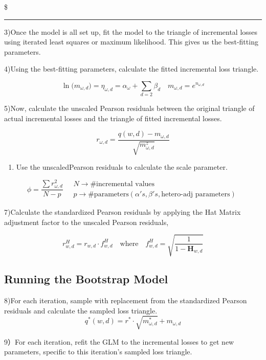 \documentclass[
]{article}
\providecommand{\tightlist}{%
  \setlength{\itemsep}{0pt}\setlength{\parskip}{0pt}}
\begin{document}
\$

\begin{center}\rule{0.5\linewidth}{0.5pt}\end{center}

3)Once the model is all set up, fit the model to the triangle of
incremental losses using iterated least squares or maximum likelihood.
This gives us the best-fitting parameters.

4)Using the best-fitting parameters, calculate the fitted incremental
loss triangle.

\[\ln\bigl(m_{\omega,d}\bigr)=\eta_{\omega,d}=\alpha_{\omega}+\sum_{d=2}\beta_{d}\quad m_{\omega,d}=e^{n_{\omega,d}}\]

5)Now, calculate the unscaled Pearson residuals between the original
triangle of actual incremental losses and the triangle of fitted
incremental losses.

\[r_{\omega,d}=\frac{q(w,d)-m_{\omega,d}}{\sqrt{m_{\omega,d}^{z}}}\]

\begin{enumerate}
\def\labelenumi{\arabic{enumi}.}
\setcounter{enumi}{5}
\tightlist
\item
  Use the unscaledPearson residuals to calculate the scale parameter.
\end{enumerate}

\[\phi=\frac{\sum r_{\omega,d}^{2}}{N-p}\quad\begin{array}{c}N\to\#\text{incremental values}\\p\to\#\text{parameters}(\alpha's,\beta's,\text{hetero-adj parameters})\end{array}\]

7)Calculate the standardized Pearson residuals by applying the Hat
Matrix adjustment factor to the unscaled Pearson residuals,

\[r_{w,d}^{H}=r_{w,d}\cdot f_{w,d}^{H}\quad\mathrm{where}\quad f_{w,d}^{H}=\sqrt{\frac{1}{1-\mathbf{H}_{w,d}}}\]

\subsection{Running the Bootstrap
Model}\label{running-the-bootstrap-model}

8)For each iteration, sample with replacement from the standardized
Pearson residuals and calculate the sampled loss triangle.
\[q^{*}(w,d)=r^{*}\cdot\sqrt{m_{\omega,d}^{*}}+m_{\omega,d}\]

9）For each iteration, refit the GLM to the incremental losses to get
new parameters, specific to this iteration's sampled loss triangle.
\end{document}

